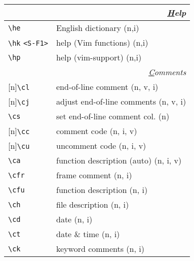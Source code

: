 \documentclass[oneside,10pt,landscape,DIV16]{scrartcl}
\newcommand{\Rep}{{\scriptsize{[n]}}}
\begin{document}
\begin{multicols}{3}
\begin{center}
\begin{tabular}[]{|p{18mm}|p{56mm}|}
\hline 
\multicolumn{2}{|r|}{\textsl{\underline{H}elp}}\\[1.0ex]
\hline \verb'\he'                 & English dictionary   \hfill (n,i)\\
\hline \verb'\hk' \verb'<S-F1>'   & help (Vim functions) \hfill (n,i)\\
\hline \verb'\hp'                 & help (vim-support)   \hfill (n,i)\\
\hline 
\hline
\multicolumn{2}{|r|}{\textsl{\underline{C}omments}}                       \\[1.0ex]
\hline \Rep\verb'\cl'   & end-of-line comment               \hfill (n, v, i)\\
\hline \Rep\verb'\cj'   & adjust end-of-line comments       \hfill (n, v, i)\\
\hline     \verb'\cs'   & set end-of-line comment col.      \hfill (n)   \\
\hline \Rep\verb'\cc'   & comment code                      \hfill (n, i, v)\\
\hline \Rep\verb'\cu'   & uncomment code                    \hfill (n, i, v)\\
\hline     \verb'\ca'   & function description (auto)       \hfill (n, i, v)\\
%
\hline     \verb'\cfr'  & frame comment                     \hfill (n, i)\\
\hline     \verb'\cfu'  & function description              \hfill (n, i)\\
\hline     \verb'\ch'   & file description                  \hfill (n, i)\\
\hline     \verb'\cd'   & date                              \hfill (n, i)\\
\hline     \verb'\ct'   & date \& time                      \hfill (n, i)\\
\hline
%
\hline     \verb'\ck'   & keyword comments                  \hfill (n, i)\\

\end{tabular}
\end{center}
\end{multicols}
\end{document}
